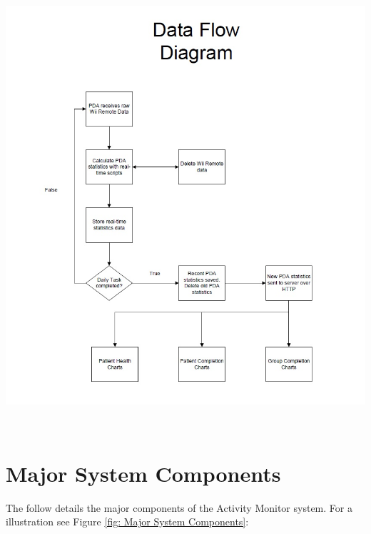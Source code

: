 \documentclass{article}
\begin{document}
\begin{center}
\includegraphics[width=6in, height=6.5in]{HLDdataFlowDiagram.jpg}
\label{fig:dataflow}
\end{center}

\newpage

\section{Major System Components}

The follow details the major components of the Activity Monitor system. For a illustration see Figure \ref{fig: Major System Components}: 
\end{document}
